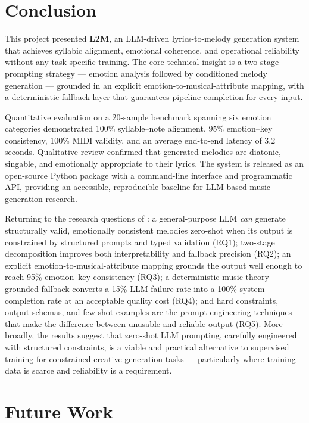 \section{Conclusion}
\label{sec:cn-conclusion}

This project presented \textbf{L2M}, an LLM-driven lyrics-to-melody
generation system that achieves syllabic alignment, emotional coherence, and
operational reliability without any task-specific training. The core
technical insight is a two-stage prompting strategy --- emotion analysis
followed by conditioned melody generation --- grounded in an explicit
emotion-to-musical-attribute mapping, with a deterministic fallback layer
that guarantees pipeline completion for every input.

Quantitative evaluation on a 20-sample benchmark spanning six emotion
categories demonstrated 100\% syllable--note alignment, 95\% emotion--key
consistency, 100\% MIDI validity, and an average end-to-end latency of 3.2
seconds. Qualitative review confirmed that generated melodies are diatonic,
singable, and emotionally appropriate to their lyrics. The system is
released as an open-source Python package with a command-line interface and
programmatic API, providing an accessible, reproducible baseline for
LLM-based music generation research.

Returning to the research questions of : a
general-purpose LLM \emph{can} generate structurally valid, emotionally
consistent melodies zero-shot when its output is constrained by structured
prompts and typed validation (RQ1); two-stage decomposition improves both
interpretability and fallback precision (RQ2); an explicit
emotion-to-musical-attribute mapping grounds the output well enough to reach
95\% emotion--key consistency (RQ3); a deterministic
music-theory-grounded fallback converts a 15\% LLM failure rate into a 100\%
system completion rate at an acceptable quality cost (RQ4); and hard
constraints, output schemas, and few-shot examples are the prompt
engineering techniques that make the difference between unusable and
reliable output (RQ5). More broadly, the results suggest that zero-shot LLM
prompting, carefully engineered with structured constraints, is a viable and
practical alternative to supervised training for constrained creative
generation tasks --- particularly where training data is scarce and
reliability is a requirement.

\section{Future Work}
\label{sec:cn-future}


